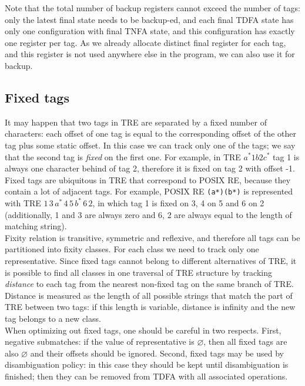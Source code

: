\documentclass{article}
\theoremstyle{definition}
\begin{document}
\begin{multicols}{2}
Note that the total number of backup registers cannot exceed the number of tags:
only the latest final state needs to be backup-ed,
and each final TDFA state has only one configuration with final TNFA state,
and this configuration has exactly one register per tag.
As we already allocate distinct final register for each tag,
and this register is not used anywhere else in the program,
we can also use it for backup.

\subsection*{Fixed tags}

It may happen that two tags in TRE are separated by a fixed number of characters:
each offset of one tag is equal to the corresponding offset of the other tag plus some static offset.
In this case we can track only one of the tags; we say that the second tag is \emph{fixed} on the first one.
For example, in TRE $a^* 1 b 2 c^*$ tag 1 is always one character behind of tag 2,
therefore it is fixed on tag 2 with offset -1.
Fixed tags are ubiquitous in TRE that correspond to POSIX RE, because they contain a lot of adjacent tags.
For example, POSIX RE \texttt{(a*)(b*)} is represented with TRE $1 \, 3 \, a^* \, 4 \, 5 \, b^* \, 6 \, 2$,
in which tag 1 is fixed on 3, 4 on 5 and 6 on 2
(additionally, 1 and 3 are always zero and 6, 2 are always equal to the length of matching string).
\\

Fixity relation is transitive, symmetric and reflexive,
and therefore all tags can be partitioned into fixity classes.
For each class we need to track only one representative.
Since fixed tags cannot belong to different alternatives of TRE,
it is possible to find all classes in one traversal of TRE structure
by tracking \emph{distance} to each tag from the nearest non-fixed tag on the same branch of TRE.
Distance is measured as the length of all possible strings that match the part of TRE between two tags:
if this length is variable, distance is infinity and the new tag belongs to a new class.
\\

When optimizing out fixed tags, one should be careful in two respects.
First, negative submatches: if the value of representative is $\varnothing$,
then all fixed tags are also $\varnothing$ and their offsets should be ignored.
Second, fixed tags may be used by disambiguation policy:
in this case they should be kept until disambiguation is finished;
then they can be removed from TDFA with all associated operations.
\\


\end{multicols}
\end{document}
